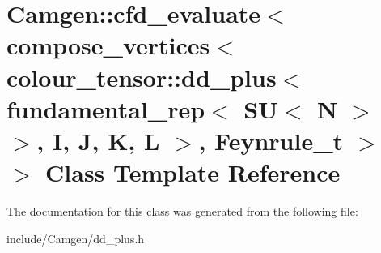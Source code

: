 \hypertarget{a00055}{}\section{Camgen\+:\+:cfd\+\_\+evaluate$<$ compose\+\_\+vertices$<$ colour\+\_\+tensor\+:\+:dd\+\_\+plus$<$ fundamental\+\_\+rep$<$ S\+U$<$ N $>$ $>$, I, J, K, L $>$, Feynrule\+\_\+t $>$ $>$ Class Template Reference}
\label{a00055}


The documentation for this class was generated from the following file\+:\begin{DoxyCompactItemize}
\item 
include/\+Camgen/dd\+\_\+plus.\+h\end{DoxyCompactItemize}
